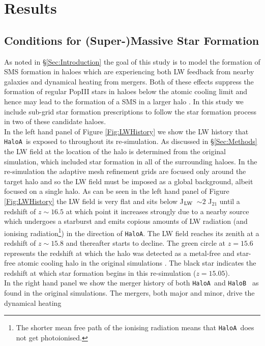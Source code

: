 \documentclass[twocolumn,iop,revtex4]{openjournal}
\newcommand{\JLW} {J$_{\rm LW}$}
\newcommand{\ha} {\texttt{HaloA~}}
\newcommand{\hb} {\texttt{HaloB~}}
\newcommand{\hac} {\texttt{HaloA}}
\begin{document}
\section{Results} \label{Sec:Results}

\subsection{Conditions for (Super-)Massive Star Formation}
As noted in \S \ref{Sec:Introduction} the goal of this study is to model the formation of
SMS formation in haloes which are experiencing both LW feedback from nearby galaxies and
dynamical heating from mergers. Both of these effects suppress the formation of regular
PopIII stars in haloes
below the atomic cooling limit and hence may lead to the formation of a SMS in a larger
halo  \citep[as was found in][]{Wise_2019}. In this study we include 
sub-grid star formation prescriptions to follow the star formation process in 
two of these candidate haloes.\\
\indent In the left hand panel of Figure \ref{Fig:LWHistory} we show the LW history that \ha is
exposed to throughout its re-simulation. As discussed in \S \ref{Sec:Methods} the LW field at the
location of the halo is determined from the original simulation, which included star formation
in all of the surrounding haloes. In the re-simulation the adaptive mesh refinement
grids are focused only around the
target halo and so the LW field must be imposed as a global background, albeit focused on a single
halo. As can be seen in the left hand panel of Figure \ref{Fig:LWHistory} the LW field is
very flat and sits below \JLW \ $\sim 2$
J$_{21}$ until a redshift of $z \sim 16.5$ at which point it increases strongly due to a nearby source
which undergoes a starburst and emits copious amounts of LW radiation
(and ionising radiation\footnote{The
  shorter mean free path of the ionising radiation means that \ha does not get photoionised.}) in the
direction of \hac. The LW field reaches its zenith at a redshift of $z \sim 15.8$ and thereafter
starts to decline. The green circle at $z = 15.6$ represents the redshift at which the halo was
detected as a metal-free and star-free atomic cooling halo in the original simulations
\citep[see][for details]{Regan_2020}. The black star indicates the redshift at which star
formation begins in this re-simulation ($z = 15.05$). \\
\indent In the right hand panel we show the merger history of both \ha and \hb
as found in the original simulations. The mergers, both major and minor, drive the dynamical heating
\end{document}
